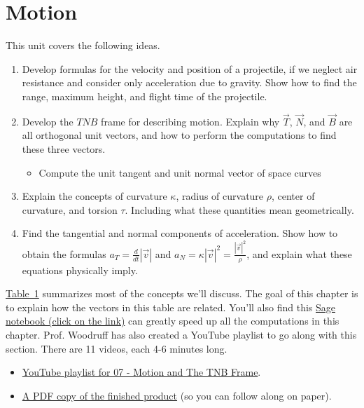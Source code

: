 \documentclass[10pt,]{book}
\theoremstyle{plain}
\theoremstyle{definition}
\theoremstyle{definition}
\theoremstyle{definition}
\theoremstyle{definition}
\theoremstyle{definition}
\numberwithin{equation}{section}
\newcommand{\sageurlforcurvature}{http://bmw.byuimath.com/dokuwiki/doku.php?id=curvature_calculator}
\begin{document}
\chapter[{Motion}]{Motion}\label{chapter-8}
This unit covers the following ideas. \leavevmode%
\begin{enumerate}
\item\hypertarget{li-88}{}Develop formulas for the velocity and position of a projectile, if we neglect air resistance and consider only acceleration due to gravity. Show how to find the range, maximum height, and flight time of the projectile.%
\item\hypertarget{li-89}{}Develop the \(TNB\) frame for describing motion. Explain why \(\vec T\), \(\vec N\), and \(\vec B\) are all orthogonal unit vectors, and how to perform the computations to find these three vectors. %
\begin{itemize}[label=\textbullet]
\item{}Compute the unit tangent and unit normal vector of space curves%
\end{itemize}
%
\item\hypertarget{li-91}{}Explain the concepts of curvature \(\kappa\), radius of curvature \(\rho\), center of curvature, and torsion \(\tau\). Including what these quantities mean geometrically.%
\item\hypertarget{li-92}{}Find the tangential and normal components of acceleration. Show how to obtain the formulas \(a_T=\frac{d}{dt}|\vec v|\) and \(a_N=\kappa |\vec v|^2=\frac{|\vec v|^2}{\rho}\), and explain what these equations physically imply.%
\end{enumerate}
%
\par
\hyperref[motion_table]{Table~1} summarizes most of the concepts we'll discuss. The goal of this chapter is to explain how the vectors in this table are related. You'll also find this \href{\\sageurlforcurvature}{Sage notebook (click on the link)} can greatly speed up all the computations in this chapter. Prof. Woodruff has also created a YouTube playlist to go along with this section. There are 11 videos, each 4-6 minutes long. \leavevmode%
\begin{itemize}[label=\textbullet]
\item{}\href{http://www.youtube.com/playlist?list=PL30EE81142B1ED1F0\&feature=plcp}{YouTube playlist for 07 - Motion and The TNB Frame}.%
\item{}\href{http://db.tt/FmEGk9p5}{A PDF copy of the finished product} (so you can follow along on paper).%
\end{itemize}
\end{document}
